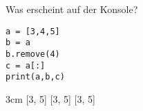 \question[3]
Was erscheint auf der Konsole?
\begin{lstlisting}
a = [3,4,5]
b = a
b.remove(4)
c = a[:]
print(a,b,c)
\end{lstlisting}
\begin{solutionbox}{3cm}
[3, 5] [3, 5] [3, 5]
\end{solutionbox}
